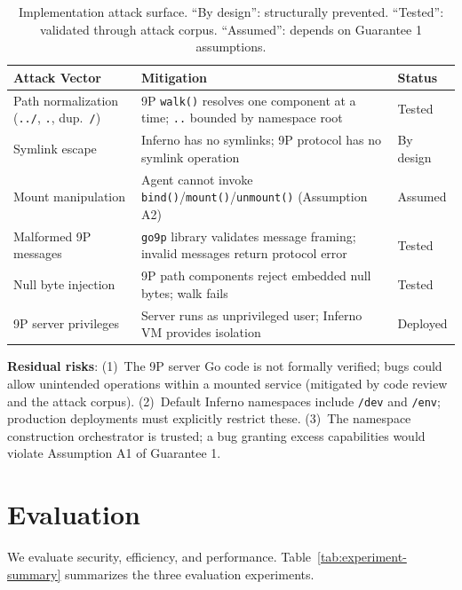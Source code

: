 \documentclass{article}
\begin{document}
\begin{table}[h]
\centering
\small
\begin{tabular}{p{2.2cm}p{3.2cm}p{1.5cm}}
\hline
\textbf{Attack Vector} & \textbf{Mitigation} & \textbf{Status} \\
\hline
Path normalization (\texttt{../}, \texttt{.}, dup.\ \texttt{/}) & 9P \texttt{walk()} resolves one component at a time; \texttt{..} bounded by namespace root & Tested \\
Symlink escape & Inferno has no symlinks; 9P protocol has no symlink operation & By design \\
Mount manipulation & Agent cannot invoke \texttt{bind()}/\texttt{mount()}/\texttt{unmount()} (Assumption A2) & Assumed \\
Malformed 9P messages & \texttt{go9p} library validates message framing; invalid messages return protocol error & Tested \\
Null byte injection & 9P path components reject embedded null bytes; walk fails & Tested \\
9P server privileges & Server runs as unprivileged user; Inferno VM provides isolation & Deployed \\
\hline
\end{tabular}
\caption{Implementation attack surface. ``By design'': structurally prevented. ``Tested'': validated through attack corpus. ``Assumed'': depends on Guarantee 1 assumptions.}
\label{tab:impl-attack-surface}
\end{table}

\noindent\textbf{Residual risks}: (1)~The 9P server Go code is not formally verified; bugs could allow unintended operations within a mounted service (mitigated by code review and the attack corpus). (2)~Default Inferno namespaces include \texttt{/dev} and \texttt{/env}; production deployments must explicitly restrict these. (3)~The namespace construction orchestrator is trusted; a bug granting excess capabilities would violate Assumption A1 of Guarantee 1.

\section{Evaluation}
\label{sec:evaluation}

We evaluate security, efficiency, and performance. Table~\ref{tab:experiment-summary} summarizes the three evaluation experiments.
\end{document}
